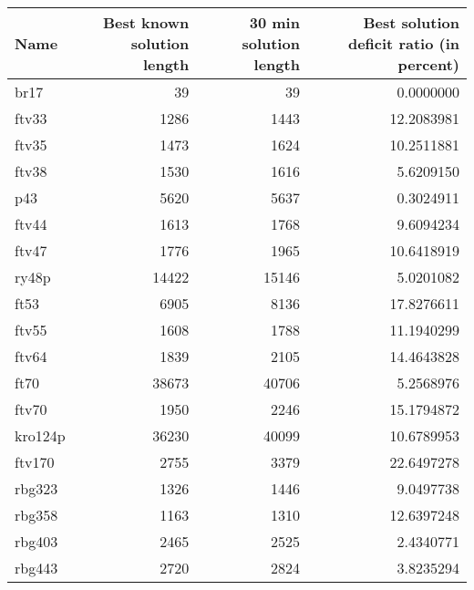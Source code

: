 \begin{table}
\centering
\begin{tabular}{l|r|r|r}
\hline
Name & Best known solution length & 30 min solution length & Best solution deficit ratio (in percent)\\
\hline
br17 & 39 & 39 & 0.0000000\\
\hline
ftv33 & 1286 & 1443 & 12.2083981\\
\hline
ftv35 & 1473 & 1624 & 10.2511881\\
\hline
ftv38 & 1530 & 1616 & 5.6209150\\
\hline
p43 & 5620 & 5637 & 0.3024911\\
\hline
ftv44 & 1613 & 1768 & 9.6094234\\
\hline
ftv47 & 1776 & 1965 & 10.6418919\\
\hline
ry48p & 14422 & 15146 & 5.0201082\\
\hline
ft53 & 6905 & 8136 & 17.8276611\\
\hline
ftv55 & 1608 & 1788 & 11.1940299\\
\hline
ftv64 & 1839 & 2105 & 14.4643828\\
\hline
ft70 & 38673 & 40706 & 5.2568976\\
\hline
ftv70 & 1950 & 2246 & 15.1794872\\
\hline
kro124p & 36230 & 40099 & 10.6789953\\
\hline
ftv170 & 2755 & 3379 & 22.6497278\\
\hline
rbg323 & 1326 & 1446 & 9.0497738\\
\hline
rbg358 & 1163 & 1310 & 12.6397248\\
\hline
rbg403 & 2465 & 2525 & 2.4340771\\
\hline
rbg443 & 2720 & 2824 & 3.8235294\\
\hline
\end{tabular}
\end{table}
